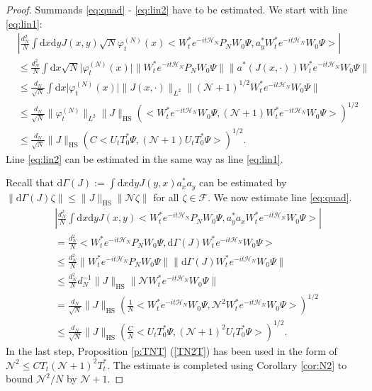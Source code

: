 \documentclass[11pt,a4paper,draft,DIV11]{scrartcl}	%
\newcommand{\fock}{\mathcal{F}}		%
\newcommand{\di}{\textrm{d}}		%
\newcommand{\Ncal}{\mathcal{N}}		%
\newcommand{\Hcal}{\mathcal{H}}		%
\newcommand{\scal}[2]{\big<#1,#2\big>} %
\newcommand{\norm}[1]{\lVert#1\rVert}	%
\newcommand{\ph}{\varphi_t^{(N)}}	%
\begin{document}
\begin{proof}
Summands \eqref{eq:quad} - \eqref{eq:lin2} have to be estimated. We start with line \eqref{eq:lin1}:
\begin{align*}
& \left\lvert \frac{d_N^2}{N} \int \di x\di y J(x,y) \sqrt{N} \ph(x) \scal{W^\ast_t e^{-it\Hcal_N} P_N W_0 \Psi}{a^\ast_y W^\ast_t e^{-it \Hcal_N} W_0 \Psi} \right\rvert \\
& \leq \frac{d_N^2}{N} \int \di x \sqrt{N} \lvert \ph(x)\rvert \norm{W^\ast_t e^{-it \Hcal_N} P_N W_0 \Psi} \norm{ a^\ast(J(x,\cdot))W^\ast_t e^{-it \Hcal_N} W_0 \Psi} \\
& \leq \frac{d_N}{\sqrt{N}} \int \di x \lvert \ph(x)\rvert \norm{J(x,\cdot)}_{L^2} \norm{(\Ncal+1)^{1/2}W^\ast_t e^{-it\Hcal_N}W_0 \Psi} \\
& \leq \frac{d_N}{\sqrt{N}} \norm{\ph}_{L^2} \norm{J}_{\textrm{HS}} \left( \scal{W^\ast_t e^{-it \Hcal_N}W_0 \Psi}{(\Ncal+1)W^\ast_t e^{-it\Hcal_N} W_0 \Psi} \right)^{1/2} \\
& \leq \frac{d_N}{\sqrt{N}} \norm{J}_{\textrm{HS}} \left(C \scal{U_t T^\ast_0 \Psi}{(\Ncal+1)U_t T^\ast_0 \Psi} \right)^{1/2}.
\end{align*}
Line \eqref{eq:lin2} can be estimated in the same way as line \eqref{eq:lin1}.

Recall that $\di\Gamma(J) := \int \di x\di y J(y,x) a^\ast_x a_y$ can be estimated by $\norm{\di\Gamma(J)\zeta} \leq \norm{J}_{\textrm{HS}} \norm{\Ncal \zeta}$ for all $\zeta \in \fock$. We now estimate line \eqref{eq:quad}.
\begin{align*}
& \left\lvert \frac{d_N^2}{N} \int \di x\di y J(x,y) \scal{W^\ast_t e^{-it\Hcal_N} P_N W_0 \Psi}{a^\ast_y a_x W^\ast_t e^{-it \Hcal_N}W_0 \Psi} \right\rvert \\
& = \frac{d_N^2}{N} \scal{W^\ast_t e^{-it\Hcal_N}P_N W_0 \Psi}{\di\Gamma(J) W^\ast_t e^{-it\Hcal_N}W_0 \Psi} \\
& \leq \frac{d_N^2}{N} \norm{W^\ast_t e^{-it\Hcal_N}P_N W_0 \Psi} \norm{\di\Gamma(J)W^\ast_t e^{-it \Hcal_N}W_0 \Psi} \\
& \leq \frac{d_N^2}{N} d_N^{-1} \norm{J}_{\textrm{HS}} \norm{\Ncal W^\ast_t e^{-it\Hcal_N}W_0 \Psi} \\
& = \frac{d_N}{\sqrt{N}} \norm{J}_{\textrm{HS}} \left( \frac{1}{N} \scal{W^\ast_t e^{-it\Hcal_N}W_0 \Psi}{\Ncal^2 W^\ast_t e^{-it\Hcal_N}W_0 \Psi} \right)^{1/2} \\
& \leq \frac{d_N}{\sqrt{N}} \norm{J}_{\textrm{HS}} \left( \frac{C}{N} \scal{U_t T^\ast_0 \Psi}{(\Ncal+1)^2 U_t T^\ast_0 \Psi} \right)^{1/2}.
\end{align*}
In the last step, Proposition \ref{p:TNT} (\ref{TN2T}) has been used in the form of $\Ncal^2 \leq C T_t (\Ncal+1)^2 T^\ast_t$. The estimate is completed using Corollary \ref{cor:N2} to bound $\Ncal^2/N$ by $\Ncal+1$.
\end{proof}
\end{document}
